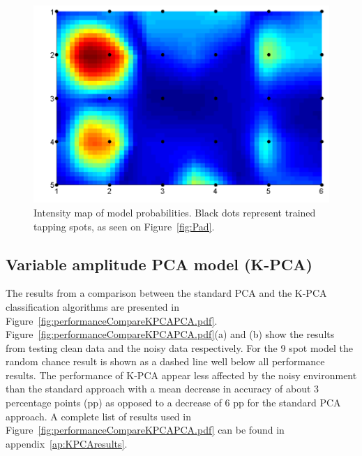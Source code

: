 \begin{figure}[!]
\centering
\includegraphics[width=150mm]{padPlot.pdf}
\caption{Intensity map of model probabilities. Black dots represent trained tapping spots, as seen on Figure~\ref{fig:Pad}. }\label{fig:padPlot}
\end{figure}

\subsection{Variable amplitude PCA model (K-PCA)}

The results from a comparison between the standard PCA and the K-PCA classification algorithms are presented in Figure~\ref{fig:performanceCompareKPCAPCA.pdf}. Figure~\ref{fig:performanceCompareKPCAPCA.pdf}(a) and (b) show the results from testing clean data and the noisy data respectively. For the 9 spot model the random chance result is shown as a dashed line well below all performance results. The performance of K-PCA appear less affected by the noisy environment than the standard approach with a mean decrease in accuracy of about 3 percentage points (pp) as opposed to a decrease of 6 pp for the standard PCA approach. A complete list of results used in Figure~\ref{fig:performanceCompareKPCAPCA.pdf} can be found in appendix~\ref{ap:KPCAresults}.

